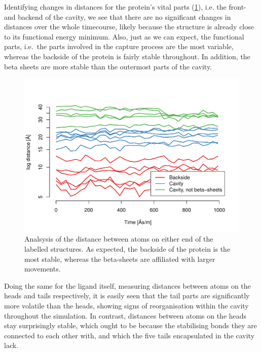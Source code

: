 \documentclass[10pt]{article}\usepackage[]{graphicx}\usepackage[]{color}
\makeatletter
\def\maxwidth{ %
  \ifdim\Gin@nat@width>\linewidth
    \linewidth
  \else
    \Gin@nat@width
  \fi
}
\theoremstyle{plain}
\makeatother
\begin{document}
\begin{multicols*}{2}
Identifying changes in distances for the protein's vital parts (\cref{fig:bounddists}), i.e. the front- and backend of the cavity, we see that there are no significant changes in distances over the whole timecourse, likely because the structure is already close to its functional energy minimum. Also, just as we can expect, the functional parts, i.e.\ the parts involved in the capture process are the most variable, whereas the backside of the protein is fairly stable throughout. In addition, the beta sheets are more stable than the outermost parts of the cavity.
  
\begin{Schunk}
\begin{figure}[H]

{\centering \includegraphics[width=\maxwidth]{figure/twocolumn-bounddists-1} 

}

\caption[Analsysis of the distance between atoms on either end of the labelled structures]{Analsysis of the distance between atoms on either end of the labelled structures. As expected, the backside of the protein is the most stable, whereas the beta-sheets are affiliated with larger movements.}\label{fig:bounddists}
\end{figure}
\end{Schunk}

Doing the same for the ligand itself, measuring distances between atoms on the heads and tails respectively, it is easily seen that the tail parts are significantly more volatile than the heads, showing signs of reorganisation within the cavity throughout the simulation. In contrast, distances between atoms on the heads stay surprisingly stable, which ought to be because the stabilising bonds they are connected to each other with, and which the five tails encapsulated in the cavity lack. 


\end{multicols*}
\end{document}

